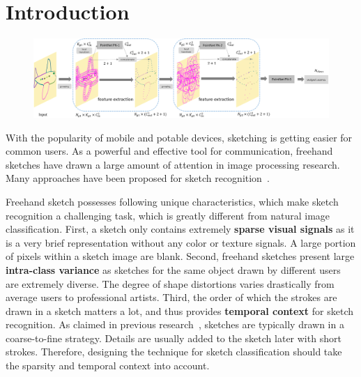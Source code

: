 \section{Introduction}
\label{sec:intro}

 
 \begin{figure} 
 	\center
 	\includegraphics[width=\textwidth]{images/sketchpointnet.png}
 	\label{fig:sketchpointnet}
 \end{figure}


With the popularity of mobile and potable devices, sketching is getting easier for common users. As a powerful and effective tool for communication, freehand sketches have drawn a large amount of attention in image processing research.
Many approaches have been proposed for sketch recognition~\cite{Eitz2012HowDH, LiHSG15, Schneider2014SketchCA, Yu2015SketchaNetTB, Seddati2015DeepSketchDC, Dupont2016DeepSketch2D}.


Freehand sketch possesses following unique characteristics, which make sketch recognition a challenging task, which is greatly different from natural image classification.
%
First, a sketch only contains extremely \textbf{sparse visual signals} as it is a very brief representation without any color or texture signals.
A large portion of pixels within a sketch image are blank.
%
Second, freehand sketches present large \textbf{intra-class variance} as sketches for the same object drawn by different users are extremely diverse.
The degree of shape distortions varies drastically from average users to professional artists. 
%
Third, the order of which the strokes are drawn in a sketch matters a lot, and thus provides \textbf{temporal context} for sketch recognition.
As claimed in previous research~\cite{Eitz2012HowDH}, sketches are typically drawn in a coarse-to-fine strategy. Details are usually added to the sketch later with short strokes.
Therefore, designing the technique for sketch classification should take the sparsity and temporal context into account.



